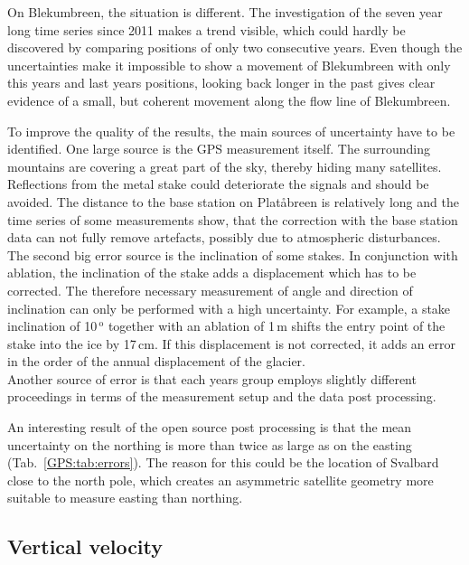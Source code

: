 On Blekumbreen, the situation is different.
The investigation of the seven year long time series since 2011 makes a trend visible,
which could hardly be discovered by comparing positions of only two consecutive years.
Even though the uncertainties make it impossible to show a movement of Blekumbreen with only this years
and last years positions,
looking back longer in the past gives clear evidence of a small, but coherent movement along the flow line of Blekumbreen.

To improve the quality of the results,
the main sources of uncertainty have to be identified.
One large source is the GPS measurement itself.
The surrounding mountains are covering a great part of the sky,
thereby hiding many satellites.
Reflections from the metal stake could deteriorate the signals and should be avoided.
The distance to the base station on Platåbreen is relatively long and the time series of some measurements show,
that the correction with the base station data can not fully remove artefacts,
possibly due to atmospheric disturbances.\\
The second big error source is the inclination of some stakes.
In conjunction with ablation, the inclination of the stake adds a displacement which has to be corrected.
The therefore necessary measurement of angle and direction of inclination can only be performed with a high uncertainty.
For example, a stake inclination of 10\,$^\text{o}$ together with an ablation of 1\,m shifts the entry point of the stake
into the ice by 17\,cm.
If this displacement is not corrected,
it adds an error in the order of the annual displacement of the glacier.\\
Another source of error is that each years group employs slightly different proceedings in terms
of the measurement setup and the data post processing.

An interesting result of the open source post processing is that the mean uncertainty on the northing is
more than twice as large as on the easting (Tab.~\ref{GPS:tab:errors}).
The reason for this could be the location of Svalbard close to the north pole,
which creates an asymmetric satellite geometry more suitable to measure easting than northing.


\subsection{Vertical velocity}

